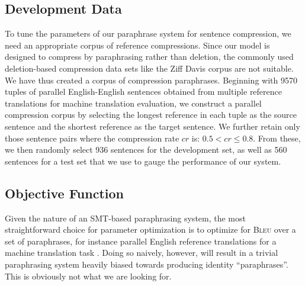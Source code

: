 \documentclass[11pt]{article}
\begin{document}
\subsection{Development Data}
\label{dev-data}
To tune the parameters of our paraphrase system for sentence
compression, we need an appropriate corpus of reference
compressions. Since our model is designed to compress by paraphrasing
rather than deletion, the commonly used deletion-based compression
data sets like the Ziff Davis corpus are not suitable. We have
thus created a corpus of compression paraphrases. Beginning with 9570
tuples of parallel English-English sentences obtained from multiple
reference translations for machine translation evaluation, we
construct a parallel compression corpus by selecting the longest
reference in each tuple as the source sentence and the shortest
reference as the target sentence. We further retain only those
sentence pairs where the compression rate $\mathit{cr}$ is: $0.5 <
\mathit{cr} \leq 0.8$. From these, we then randomly select 936
sentences for the development set, as well as 560 sentences for a test
set that we use to gauge the performance of our system.


\subsection{Objective Function}
\label{objective-fn}

Given the nature of an SMT-based paraphrasing system, the most
straightforward choice for parameter optimization is to optimize for
\textsc{Bleu} over a set of paraphrases, for instance parallel English
reference translations for a machine translation task
\cite{Madnani2007}. Doing so naively, however, will result in a
trivial paraphrasing system heavily biased towards producing identity
``paraphrases''. This is obviously not what we are looking for.

\end{document}
